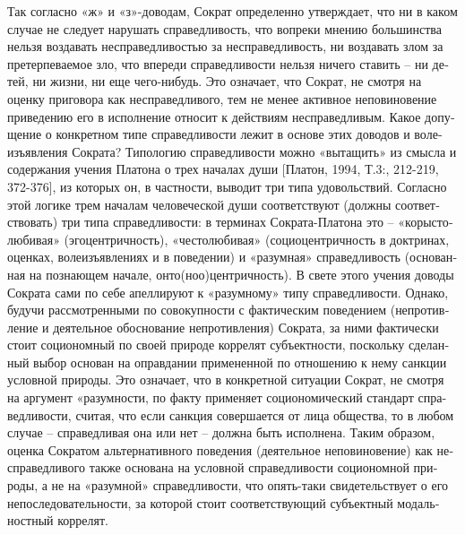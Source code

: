 \begin{russian}
    Так согласно «ж» и «з»-доводам, Сократ определенно утверждает, что ни в каком случае не следует нарушать справедливость, что вопреки мнению большинства нельзя воздавать несправедливостью за несправедливость, ни воздавать злом за претерпеваемое зло, что впереди справедливости нельзя ничего ставить – ни детей, ни жизни, ни еще чего-нибудь. Это означает, что Сократ, не смотря на оценку приговора как несправедливого, тем не менее активное неповиновение приведению его в исполнение относит к действиям несправедливым. Какое допущение о конкретном типе справедливости лежит в основе этих доводов и волеизъявления Сократа?
    Типологию справедливости можно «вытащить» из смысла и содержания учения Платона о трех началах души [Платон, 1994, Т.3:, 212-219, 372-376], из которых он, в частности, выводит три типа удовольствий. Согласно этой логике трем началам человеческой души соответствуют (должны соответствовать) три типа справедливости: в терминах Сократа-Платона это – «корыстолюбивая» (эгоцентричность), «честолюбивая» (социоцентричность в доктринах, оценках, волеизъявлениях и в поведении) и «разумная» справедливость (основанная на познающем начале, онто(ноо)центричность). В свете этого учения доводы Сократа сами по себе апеллируют к «разумному» типу справедливости. Однако, будучи рассмотренными по совокупности с фактическим поведением (непротивление и деятельное обоснование непротивления) Сократа, за ними фактически стоит социономный по своей природе коррелят субъектности, поскольку сделанный выбор основан на оправдании примененной по отношению к нему санкции условной природы. Это означает, что в конкретной ситуации Сократ, не смотря на аргумент «разумности, по факту применяет социономический стандарт справедливости, считая, что если санкция совершается от лица общества, то в любом случае – справедливая она или нет – должна быть исполнена.
    Таким образом, оценка Сократом альтернативного поведения (деятельное неповиновение) как несправедливого также  основана на условной справедливости социономной природы, а не на «разумной» справедливости, что опять-таки свидетельствует о его непоследовательности, за которой стоит соответствующий субъектный модальностный коррелят. 

\end{russian}
